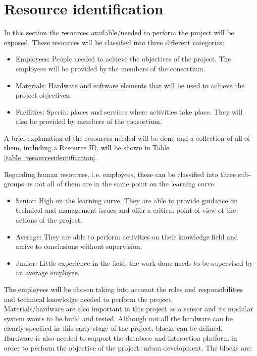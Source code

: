 \section{Resource identification}
\label{sec4.1}

In this section the resources available/needed to perform the project will be exposed. These resources will be classified into three different categories: 

\begin{itemize}
\item Employees: People needed to achieve the objectives of the project. The employees will be provided by the members of the consortium. 
\item Materials: Hardware and software elements that will be used to achieve the project objectives.
\item Facilities: Special places and services where activities take place. They will also be provided by members of the consortium.
\end{itemize}

A brief explanation of the resources needed will be done and a collection of all of them, including a Resource ID, will be shown in Table \ref{table_resourcesidentification}.

Regarding human resources, i.e. employees, these can be classified into three sub-groups as not all of them are in the same point on the learning curve.

\begin{itemize}
\item Senior: High on the learning curve. They are able to provide guidance on technical and management issues and offer a critical point of view of the actions of the project.
\item Average: They are able to perform activities on their knowledge field and arrive to conclusions without supervision.
\item Junior: Little experience in the field, the work done needs to be supervised by an average employee.
\end{itemize}

The employees will be chosen taking into account the roles and responsibilities and technical knowledge needed to perform the project.\\
Materials/hardware are also important in this project as a sensor and its modular system wants to be build and tested. Although not all the hardware can be clearly specified in this early stage of the project, blocks can be defined. Hardware is also needed to support the database and interaction platform in order to perform the objective of the project: urban development. The blocks are: 

